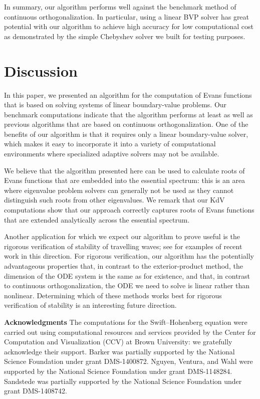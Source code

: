 \documentclass[10pt]{article}
\newenvironment{Acknowledgment}%
 {\begin{trivlist}\item[]\textbf{Acknowledgments }}{\end{trivlist}}
\numberwithin{equation}{section}
\begin{document}
In summary, our algorithm performs well against the benchmark method of continuous orthogonalization. In particular, using a linear BVP solver has great potential with our algorithm to achieve high accuracy for low computational cost as demonstrated by the simple Chebyshev solver we built for testing purposes.


\section{Discussion}\label{s4}

In this paper, we presented an algorithm for the computation of Evans functions that is based on solving systems of linear boundary-value problems. Our benchmark computations indicate that the algorithm performs at least as well as previous algorithms that are based on continuous orthogonalization. One of the benefits of our algorithm is that it requires only a linear boundary-value solver, which makes it easy to incorporate it into a variety of computational environments where specialized adaptive solvers may not be available.

We believe that the algorithm presented here can be used to calculate roots of Evans functions that are embedded into the essential spectrum: this is an area where eigenvalue problem solvers can generally not be used as they cannot distinguish such roots from other eigenvalues. We remark that our KdV computations show that our approach correctly captures roots of Evans functions that are extended analytically across the essential spectrum.

Another application for which we expect our algorithm to prove useful is the rigorous verification of stability of travelling waves; see \citep{Barker,SZ} for examples of recent work in this direction. For rigorous verification, our algorithm has the potentially advantageous properties that, in contrast to the exterior-product method, the dimension of the ODE system is the same as for existence, and that, in contrast to continuous orthogonalization, the ODE we need to solve is linear rather than nonlinear. Determining which of these methods works best for rigorous verification of stability is an interesting future direction.

\begin{Acknowledgment}
The computations for the Swift--Hohenberg equation were carried out using computational resources and services provided by the Center for Computation and Visualization (CCV) at Brown University: we gratefully acknowledge their support. Barker was partially supported by the National Science Foundation under grant DMS-1400872. Nguyen, Ventura, and Wahl were supported by the National Science Foundation under grant DMS-1148284. Sandstede was partially supported by the National Science Foundation under grant DMS-1408742.
\end{Acknowledgment}




\end{document}
